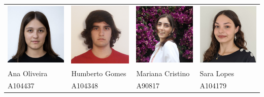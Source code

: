 \documentclass[12pt, a4paper]{article}
\begin{document}
\begin{adjustwidth}{-2cm}{-2cm} %
    \begin{center}
        \begin{tabular}{>{\centering}p{}
                        >{\centering}p{}
                        >{\centering}p{}
                        >{\centering\arraybackslash}p{}}
            \includegraphics[width=3.5cm]{res/cover/A104437.png} &
            \includegraphics[width=3.5cm]{res/cover/A104348.png} &
            \includegraphics[width=3.5cm]{res/cover/A90817.png} &
            \includegraphics[width=3.5cm]{res/cover/A104179.png} \\

            Ana Oliveira & Humberto Gomes & Mariana Cristino & Sara Lopes \\
            A104437      & A104348        & A90817           & A104179
        \end{tabular}
    \end{center}
\end{adjustwidth}
\end{document}
